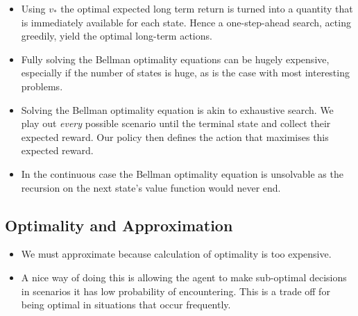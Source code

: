 \begin{itemize}
\item Using \(v_*\) the optimal expected long term return is turned into a quantity that is immediately available for each state. Hence a one-step-ahead search, acting greedily, yield the optimal long-term actions.
\item Fully solving the Bellman optimality equations can be hugely expensive, especially if the number of states is huge, as is the case with most interesting problems.
\item Solving the Bellman optimality equation is akin to exhaustive search. We play out \textit{every} possible scenario until the terminal state and collect their expected reward. Our policy then defines the action that maximises this expected reward. 
\item In the continuous case the Bellman optimality equation is unsolvable as the recursion on the next state's value function would never end.
\end{itemize}

\subsection{Optimality and Approximation}
\begin{itemize}
	\item We must approximate because calculation of optimality is too expensive.
	\item A nice way of doing this is allowing the agent to make sub-optimal decisions in scenarios it has low probability of encountering. This is a trade off for being optimal in situations that occur frequently.
\end{itemize}

